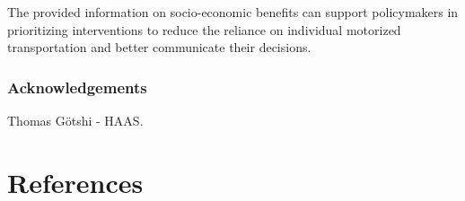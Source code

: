 \documentclass[runningheads]{llncs}
\begin{document}
The provided information on socio-economic benefits can support
policymakers in prioritizing interventions to reduce the reliance on
individual motorized transportation and better communicate their
decisions.

\hypertarget{acknowledgements}{%
\subsubsection*{Acknowledgements}\label{acknowledgements}}

Thomas Götshi - HAAS.

\hypertarget{references}{%
\section*{References}\label{references}}
\end{document}

